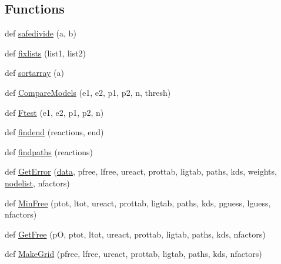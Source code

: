 \subsection*{Functions}
\begin{DoxyCompactItemize}
\item 
def \hyperlink{namespace_uni_dec_1_1unidec__modules_1_1_uni_fit_a21f9321ed611309388d2577af921c32c}{safedivide} (a, b)
\item 
def \hyperlink{namespace_uni_dec_1_1unidec__modules_1_1_uni_fit_ad077c39b079e0eb49dc08ed0150cff69}{fixlists} (list1, list2)
\item 
def \hyperlink{namespace_uni_dec_1_1unidec__modules_1_1_uni_fit_a6b93e9450a15b72d4aa7d98d761b36b1}{sortarray} (a)
\item 
def \hyperlink{namespace_uni_dec_1_1unidec__modules_1_1_uni_fit_a62019ec029ceece1cefce32b544032ee}{Compare\+Models} (e1, e2, p1, p2, n, thresh)
\item 
def \hyperlink{namespace_uni_dec_1_1unidec__modules_1_1_uni_fit_af0202beff5f78f13a21adb8e9005649d}{Ftest} (e1, e2, p1, p2, n)
\item 
def \hyperlink{namespace_uni_dec_1_1unidec__modules_1_1_uni_fit_afe8c9ef4ecad5e2cd745046e722a68ac}{findend} (reactions, end)
\item 
def \hyperlink{namespace_uni_dec_1_1unidec__modules_1_1_uni_fit_a505b6c27f3bd8e676dec018631c4c71f}{findpaths} (reactions)
\item 
def \hyperlink{namespace_uni_dec_1_1unidec__modules_1_1_uni_fit_a03cd7441589921dfd2a6417a5fe6c374}{Get\+Error} (\hyperlink{namespace_uni_dec_1_1unidec__modules_1_1_uni_fit_abe318bc901f95348802963e243c953c1}{data}, pfree, lfree, ureact, prottab, ligtab, paths, kds, weights, \hyperlink{namespace_uni_dec_1_1unidec__modules_1_1_uni_fit_a47c1df55ded9e5a7066ef069289b2b43}{nodelist}, nfactors)
\item 
def \hyperlink{namespace_uni_dec_1_1unidec__modules_1_1_uni_fit_ae66f9cd08cf008e944fd544ec548421a}{Min\+Free} (ptot, ltot, ureact, prottab, ligtab, paths, kds, pguess, lguess, nfactors)
\item 
def \hyperlink{namespace_uni_dec_1_1unidec__modules_1_1_uni_fit_abe6c0e9b2bf5b4fcef64ea61d4aa2e1c}{Get\+Free} (p\+O, ptot, ltot, ureact, prottab, ligtab, paths, kds, nfactors)
\item 
def \hyperlink{namespace_uni_dec_1_1unidec__modules_1_1_uni_fit_a62651332cbeade32d3b700f605435081}{Make\+Grid} (pfree, lfree, ureact, prottab, ligtab, paths, kds, nfactors)
\item 

\end{DoxyCompactItemize}
